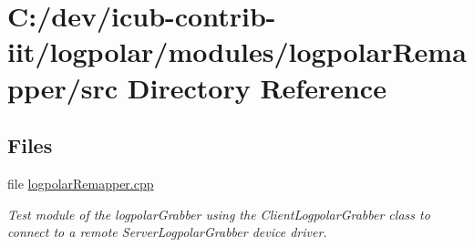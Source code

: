 \section{C\+:/dev/icub-\/contrib-\/iit/logpolar/modules/logpolar\+Remapper/src Directory Reference}
\label{dir_359f6f258b16793891881c960d9d52ad}
\subsection*{Files}
\begin{DoxyCompactItemize}
\item 
file \hyperlink{logpolarRemapper_8cpp}{logpolar\+Remapper.\+cpp}
\begin{DoxyCompactList}\small\item\em Test module of the logpolar\+Grabber using the Client\+Logpolar\+Grabber class to connect to a remote Server\+Logpolar\+Grabber device driver. \end{DoxyCompactList}\end{DoxyCompactItemize}
